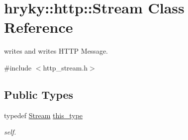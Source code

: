 \hypertarget{classhryky_1_1http_1_1_stream}{\section{hryky\-:\-:http\-:\-:Stream Class Reference}
\label{classhryky_1_1http_1_1_stream}
}


writes and writes H\-T\-T\-P Message.  




{\ttfamily \#include $<$http\-\_\-stream.\-h$>$}

\subsection*{Public Types}
\begin{DoxyCompactItemize}
\item 
\hypertarget{classhryky_1_1http_1_1_stream_ab09386542f788b82fc59357ed62093ed}{typedef \hyperlink{classhryky_1_1http_1_1_stream}{Stream} \hyperlink{classhryky_1_1http_1_1_stream_ab09386542f788b82fc59357ed62093ed}{this\-\_\-type}}\label{classhryky_1_1http_1_1_stream_ab09386542f788b82fc59357ed62093ed}

\begin{DoxyCompactList}\small\item\em self. \end{DoxyCompactList}\end{DoxyCompactItemize}

